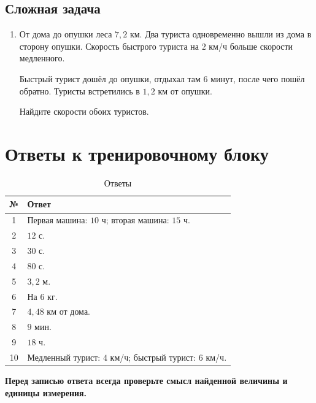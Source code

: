 \documentclass[a4paper,12pt]{article}
\begin{document}
\subsection*{Сложная задача}

\begin{enumerate}[label=\textbf{\arabic*.},start=10]

\item
От дома до опушки леса \(7{,}2\) км.
Два туриста одновременно вышли из дома в сторону опушки.
Скорость быстрого туриста на \(2\) км/ч больше скорости медленного.

Быстрый турист дошёл до опушки, отдыхал там \(6\) минут,
после чего пошёл обратно.
Туристы встретились в \(1{,}2\) км от опушки.

Найдите скорости обоих туристов.

\end{enumerate}


\clearpage

\section*{Ответы к тренировочному блоку}

\begin{table}[ht]
\centering
\caption{Ответы}
\renewcommand{\arraystretch}{1.55}
\begin{tabularx}{\linewidth}{c Y}
\toprule
№ & Ответ \\
\midrule

1 &
Первая машина: \(10\) ч;
вторая машина: \(15\) ч. \\

2 &
\(12\) с. \\

3 &
\(30\) с. \\

4 &
\(80\) с. \\

5 &
\(3{,}2\) м. \\

6 &
На \(6\) кг. \\

7 &
\(4{,}48\) км от дома. \\

8 &
\(9\) мин. \\

9 &
\(18\) ч. \\

10 &
Медленный турист: \(4\) км/ч;
быстрый турист: \(6\) км/ч. \\

\bottomrule
\end{tabularx}
\end{table}

\vfill

\begin{center}
\textcolor{darkaccent}{
\textbf{Перед записью ответа всегда проверьте смысл найденной величины
и единицы измерения.}
}
\end{center}
\end{document}
